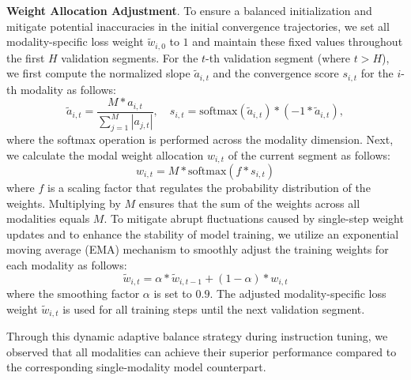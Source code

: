 \textbf{Weight Allocation Adjustment}. To ensure a balanced initialization and mitigate potential inaccuracies in the initial convergence trajectories, we set all modality-specific loss weight $\widetilde{w}_{i, 0}$ to $1$ and maintain these fixed values throughout the first $H$ validation segments. For the $t$-th validation segment (where $t > H$), we first compute the normalized slope $\widetilde{a}_{i, t}$ and the convergence score $s_{i, t}$ for the $i$-th modality as follows:
\begin{equation}
    \widetilde{a}_{i, t} = \frac{M * a_{i, t}}{\sum_{j=1}^{M}|a_{j, t}|},
    \quad s_{i, t} = \text{softmax}\left(\widetilde{a}_{i, t}\right) * \left(-1 * \widetilde{a}_{i, t}\right),
\end{equation}
where the softmax operation is performed across the modality dimension. Next, we calculate the modal weight allocation $w_{i, t}$ of the current segment as follows:
\begin{equation}
    w_{i, t} = M * \text{softmax}\left(f * s_{i, t}\right)
\end{equation}
where $f$ is a scaling factor that regulates the probability distribution of the weights. Multiplying by $M$ ensures that the sum of the weights across all modalities equals $M$. To mitigate abrupt fluctuations caused by single-step weight updates and to enhance the stability of model training, we utilize an exponential moving average (EMA) mechanism to smoothly adjust the training weights for each modality as follows:
\begin{equation}
    \widetilde{w}_{i, t} = \alpha * \widetilde{w}_{i, t-1} + (1 - \alpha) * w_{i, t}
\end{equation}
where the smoothing factor $\alpha$ is set to $0.9$. The adjusted modality-specific loss weight $\widetilde{w}_{i, t}$ is used for all training steps until the next validation segment.

Through this dynamic adaptive balance strategy during instruction tuning, we observed that all modalities can achieve their superior performance compared to the corresponding single-modality model counterpart.


